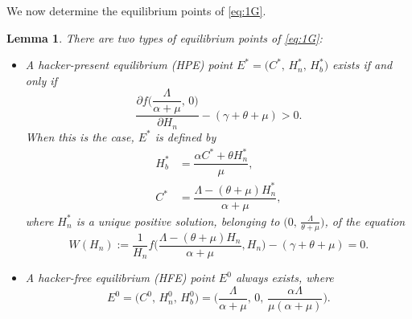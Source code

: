 \documentclass[11pt]{article}
\newtheorem{lemma}[theorem]{Lemma}
\theoremstyle{definition}
\theoremstyle{remark}
\numberwithin{equation}{section}
\begin{document}
We now determine the equilibrium points of \eqref{eq:1G}. 
\begin{lemma}\label{Lemma1}
There are two types of equilibrium points of \eqref{eq:1G}:
\begin{itemize} 
\item[(iii)] A hacker-present equilibrium (HPE) point $E^* = \big(C^*,\,H_n^*,\,H_b^*\big)$ exists if and only if 
\begin{equation}\label{eq:14}
     \dfrac{\partial f\bigg(\dfrac{\Lambda}{\alpha + \mu},\,0\bigg)}{\partial H_n} - (\gamma + \theta + \mu) > 0.
\end{equation}
When this is the case, $E^*$ is defined by
\begin{equation}\label{eq:11}
\begin{split}
  H_b^* &= \dfrac{\alpha C^* + \theta H_n^*}{\mu},\\
  C^* &= \dfrac{\Lambda - (\theta + \mu)H_n^*}{\alpha + \mu}, 
\end{split}
\end{equation}
where $H_n^*$ is a unique positive solution, belonging to $\big(0,\,\frac{\Lambda}{\theta + \mu}\big)$, of the equation
\begin{equation}\label{eq:12}
    W(H_n) := \dfrac{1}{H_n}f\bigg(\dfrac{\Lambda - (\theta + \mu)H_n}{\alpha + \mu}, H_n\bigg) - (\gamma + \theta + \mu) = 0.
\end{equation}
\item[(ii)] A hacker-free equilibrium (HFE) point $E^0$ always exists, where
\begin{equation}\label{eq:15}
E^0 = \big(C^0,\,H_n^0,\,H_b^0\big) = \bigg(\dfrac{\Lambda}{\alpha + \mu},\,0,\,\dfrac{\alpha\Lambda}{\mu(\alpha + \mu)}\bigg).
\end{equation}
\end{itemize}
\end{lemma}
\end{document}
